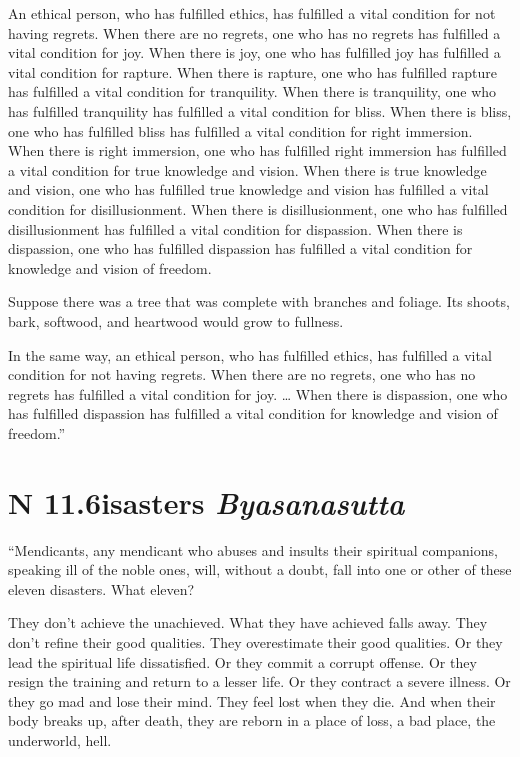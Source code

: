 \documentclass[12pt,openany]{book}%
\newcommand*{\suttatitleacronym}[1]{\smaller[2]{#1}\vspace*{.3em}}
\newcommand*{\suttatitletranslation}[1]{\linebreak{#1}}
\newcommand*{\suttatitleroot}[1]{\linebreak\smaller[2]\itshape{#1}}
\newcommand*{\tocacronym}[1]{\hspace*{-3.3em}{#1}\quad}
\newcommand*{\toctranslation}[1]{#1}
\newcommand*{\tocroot}[1]{(\textit{#1})}
\begin{document}
An ethical person, who has fulfilled ethics, has fulfilled a vital condition for not having regrets. When there are no regrets, one who has no regrets has fulfilled a vital condition for joy. When there is joy, one who has fulfilled joy has fulfilled a vital condition for rapture. When there is rapture, one who has fulfilled rapture has fulfilled a vital condition for tranquility. When there is tranquility, one who has fulfilled tranquility has fulfilled a vital condition for bliss. When there is bliss, one who has fulfilled bliss has fulfilled a vital condition for right immersion. When there is right immersion, one who has fulfilled right immersion has fulfilled a vital condition for true knowledge and vision. When there is true knowledge and vision, one who has fulfilled true knowledge and vision has fulfilled a vital condition for disillusionment. When there is disillusionment, one who has fulfilled disillusionment has fulfilled a vital condition for dispassion. When there is dispassion, one who has fulfilled dispassion has fulfilled a vital condition for knowledge and vision of freedom. 

Suppose there was a tree that was complete with branches and foliage. Its shoots, bark, softwood, and heartwood would grow to fullness. 

In the same way, an ethical person, who has fulfilled ethics, has fulfilled a vital condition for not having regrets. When there are no regrets, one who has no regrets has fulfilled a vital condition for joy. … When there is dispassion, one who has fulfilled dispassion has fulfilled a vital condition for knowledge and vision of freedom.” 

%
\section*{{\suttatitleacronym AN 11.6}{\suttatitletranslation Disasters }{\suttatitleroot Byasanasutta}}
\addcontentsline{toc}{section}{\tocacronym{AN 11.6} \toctranslation{Disasters } \tocroot{Byasanasutta}}

“Mendicants, any mendicant who abuses and insults their spiritual companions, speaking ill of the noble ones, will, without a doubt, fall into one or other of these eleven disasters. What eleven? 

They don’t achieve the unachieved. What they have achieved falls away. They don’t refine their good qualities. They overestimate their good qualities. Or they lead the spiritual life dissatisfied. Or they commit a corrupt offense. Or they resign the training and return to a lesser life. Or they contract a severe illness. Or they go mad and lose their mind. They feel lost when they die. And when their body breaks up, after death, they are reborn in a place of loss, a bad place, the underworld, hell. 
\end{document}
